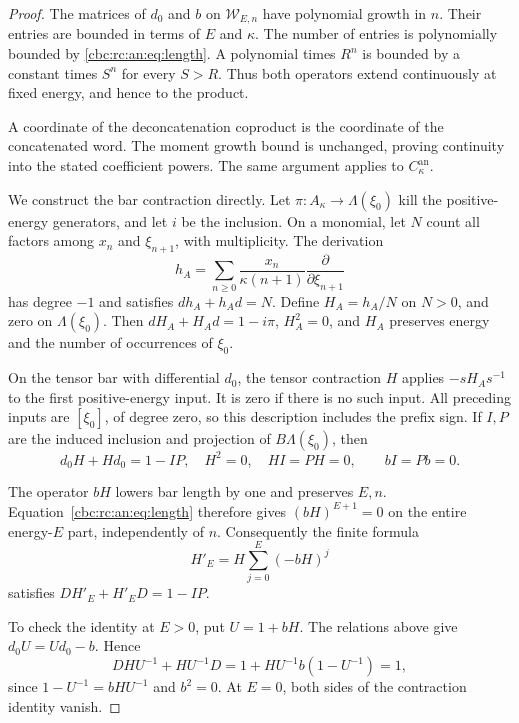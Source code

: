 \begin{proof}
The matrices of \(d_0\) and \(b\) on \(\mathcal W_{E,n}\) have
polynomial growth in \(n\). Their entries are bounded in terms of
\(E\) and \(\kappa\). The number of entries is polynomially bounded
by \eqref{cbc:rc:an:eq:length}. A polynomial times \(R^n\) is bounded by a
constant times \(S^n\) for every \(S>R\). Thus both operators extend
continuously at fixed energy, and hence to the product.

A coordinate
of the deconcatenation coproduct is the coordinate of the concatenated
word. The moment growth bound is unchanged, proving continuity into
the stated coefficient powers. The same argument applies to
\(C^{\mathrm{an}}_\kappa\).

We construct the bar contraction directly. Let \(\pi:A_\kappa\to
\Lambda(\xi_0)\) kill the positive-energy generators, and let \(i\)
be the inclusion. On a monomial, let \(N\) count all factors among
\(x_n\) and \(\xi_{n+1}\), with multiplicity. The derivation
\[
 h_A=\sum_{n\geq0}\frac{x_n}{\kappa(n+1)}
                   \frac{\partial}{\partial\xi_{n+1}}
\]
has degree \(-1\) and satisfies \(dh_A+h_Ad=N\). Define
\(H_A=h_A/N\) on \(N>0\), and zero on \(\Lambda(\xi_0)\).
Then \(dH_A+H_Ad=1-i\pi\), \(H_A^2=0\), and \(H_A\) preserves
energy and the number of occurrences of \(\xi_0\).

On the tensor bar with differential \(d_0\), the tensor contraction
\(H\) applies \(-sH_As^{-1}\) to the first positive-energy input.
It is zero if there is no such input. All preceding inputs are
\([\xi_0]\), of degree zero, so this description includes the prefix
sign. If \(I,P\) are the induced inclusion and projection of
\(B\Lambda(\xi_0)\), then
\[
 d_0H+Hd_0=1-IP,\quad H^2=0,\quad HI=PH=0,
 \qquad bI=Pb=0.
\]

The operator \(bH\) lowers bar length by one and preserves \(E,n\).
Equation~\eqref{cbc:rc:an:eq:length} therefore gives
\((bH)^{E+1}=0\) on the entire energy-\(E\) part, independently
of \(n\). Consequently the finite formula
\begin{equation}\label{cbc:rc:an:eq:contraction}
 H'_E=H\sum_{j=0}^{E}(-bH)^j
\end{equation}
satisfies \(DH'_E+H'_ED=1-IP\).

To check the identity at \(E>0\),
put \(U=1+bH\). The relations above give
\(d_0U=Ud_0-b\). Hence
\[
 DHU^{-1}+HU^{-1}D
 =1+HU^{-1}b(1-U^{-1})=1,
\]
since \(1-U^{-1}=bHU^{-1}\) and \(b^2=0\).
At \(E=0\), both sides of the contraction identity vanish.


\end{proof}
